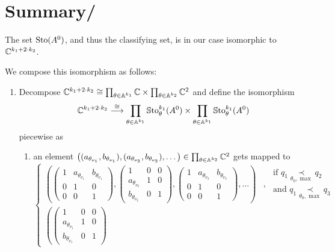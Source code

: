 \section{Summary/}
\begin{thm}
  The set $\operatorname{Sto}(A^0)$, and thus the classifying set, is in our case isomorphic
  to $\mathbb{C}^{k_1+2\cdot k_2}$.
\end{thm}
We compose this isomorphism as follows:
\begin{enumerate}
  \item Decompose $\mathbb{C}^{k_1+2\cdot k_2}\cong
    \prod_{\theta\in\mathbb{A}^{k_1}} \mathbb{C} \times \prod_{\theta\in\mathbb{A}^{k_2}} \mathbb{C}^2$ and
    define the isomorphism
    \[
      \mathbb{C}^{k_1+2\cdot k_2}\overset{\cong}\longrightarrow
      \prod_{\theta\in\mathbb{A}^{k_1}} \operatorname{\mathbb{S}to}_{\theta}^{k_1}(A^0) \times
      \prod_{\theta\in\mathbb{A}^{k_1}} \operatorname{\mathbb{S}to}_{\theta}^{k_1}(A^0)
    \]
    piecewise as
    \begin{enumerate}
      \item an element
        $\left( (a_{\theta_{\nu_1}},b_{\theta_{\nu_1}})
          ,(a_{\theta_{\nu_2}},b_{\theta_{\nu_2}})
          ,\dots
        \right)\in\prod_{\theta\in\mathbb{A}^{k_2}} \mathbb{C}^2$
        gets mapped to
        \[
          \left.
          \begin{cases}
            \left(
            \begin{pmatrix} 1 & a_{\theta_{\nu_1}} & b_{\theta_{\nu_1}} \\0 & 1 & 0 \\0 & 0 & 1 \end{pmatrix}
            ,\begin{pmatrix} 1 & 0 & 0 \\a_{\theta_{\nu_2}} & 1 & 0 \\b_{\theta_{\nu_2}} & 0 & 1 \end{pmatrix}
            ,\begin{pmatrix} 1 & a_{\theta_{\nu_3}} & b_{\theta_{\nu_3}} \\0 & 1 & 0 \\0 & 0 & 1 \end{pmatrix}
              ,\dots
            \right)
            & ,\substack{\text{~if~} q_1 \underset{\theta_0,\max}{\prec} q_2
              \\\text{~and~} q_1 \underset{\theta_0,\max}{\prec} q_3}
            \\\left(
            \begin{pmatrix} 1 & 0 & 0 \\a_{\theta_{\nu_1}} & 1 & 0 \\b_{\theta_{\nu_1}} & 0 & 1 \end{pmatrix}

\end{cases}\]
\end{enumerate}
\end{enumerate}
